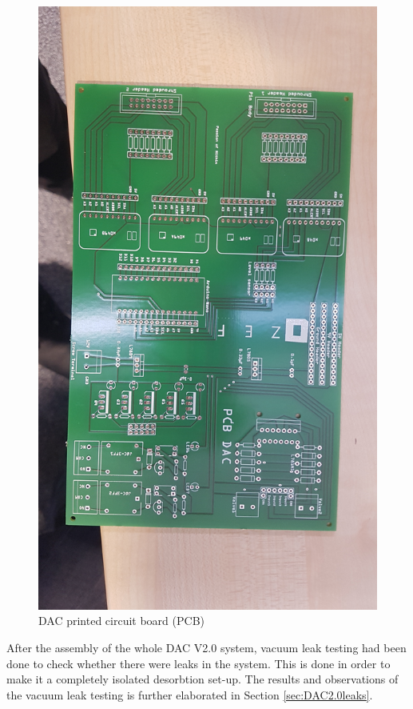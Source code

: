 \begin{itemize}
    \begin{figure}[H]
        \centering
        \includegraphics[scale = 0.09]{images/mywork/Sprint5/dacpcb.jpg}
        \caption{DAC printed circuit board (PCB)}
        \label{fig:dacpcb}
    \end{figure}
\end{itemize}

After the assembly of the whole DAC V2.0 system, vacuum leak testing had been done to check whether there were leaks in the system. This is done in order to make it a completely isolated desorbtion set-up. The results and observations of the vacuum leak testing is further elaborated in Section \ref{sec:DAC2.0leaks}.  
























